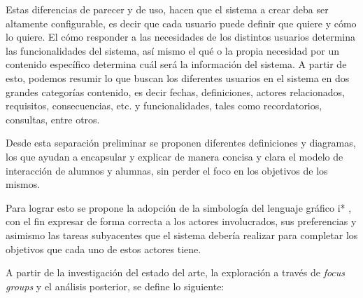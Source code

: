         \par Estas diferencias de parecer y de uso, hacen que el sistema a crear deba ser altamente configurable, es decir que cada usuario puede definir que quiere y cómo lo quiere. El cómo responder a las necesidades de los distintos usuarios determina las funcionalidades del sistema, así mismo el qué o la propia necesidad por un contenido específico determina cuál será la información del sistema. A partir de esto, podemos resumir lo que buscan los diferentes usuarios en el sistema en dos grandes categorías contenido, es decir fechas, definiciones, actores relacionados, requisitos, consecuencias, etc. y funcionalidades, tales como recordatorios, consultas, entre otros.
        \par Desde esta separación preliminar se proponen diferentes definiciones y diagramas, los que ayudan a encapsular y explicar de manera concisa y clara el modelo de interacción de alumnos y alumnas, sin perder el foco en los objetivos de los mismos.
        \par Para lograr esto se propone la adopción de la simbología del lenguaje gráfico \gls{i*} \cite{Dalpiaz2016}, con el fin expresar de forma correcta a los actores involucrados, sus preferencias y asimismo las tareas subyacentes que el sistema debería realizar para completar los objetivos que cada uno de estos actores tiene.
        \par A partir de la investigación del estado del arte, la exploración a través de \textit{focus groups} y el análisis posterior, se define lo siguiente:
        
